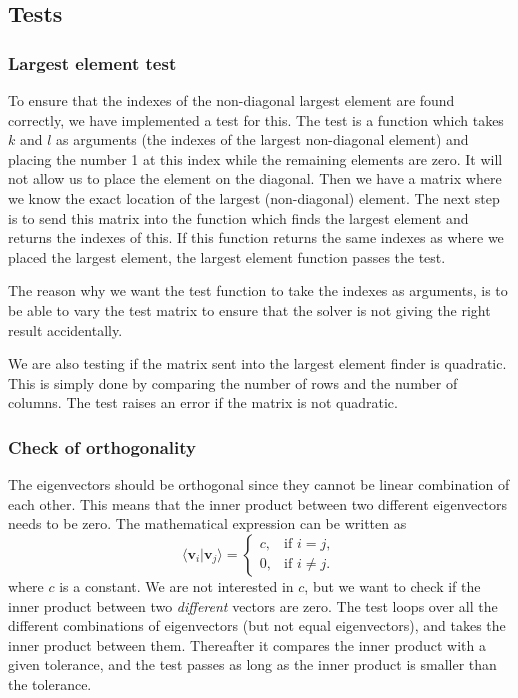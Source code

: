 \documentclass[norsk,a4paper,12pt]{article}
\begin{document}
\subsection{Tests}
\subsubsection{Largest element test}
To ensure that the indexes of the non-diagonal largest element are found correctly, we have implemented a test for this. The test is a function which takes $k$ and $l$ as arguments (the indexes of the largest non-diagonal element) and placing the number 1 at this index while the remaining elements are zero. It will not allow us to place the element on the diagonal. Then we have a matrix where we know the exact location of the largest (non-diagonal) element. The next step is to send this matrix into the function which finds the largest element and returns the indexes of this. If this function returns the same indexes as where we placed the largest element, the largest element function passes the test.\par\vspace{3mm}
The reason why we want the test function to take the indexes as arguments, is to be able to vary the test matrix to ensure that the solver is not giving the right result accidentally.\par\vspace{3mm} 
We are also testing if the matrix sent into the largest element finder is quadratic. This is simply done by comparing the number of rows and the number of columns. The test raises an error if the matrix is not quadratic.

\subsubsection{Check of orthogonality}
The eigenvectors should be orthogonal since they cannot be linear combination of each other. This means that the inner product between two different eigenvectors needs to be zero. The mathematical expression can be written as
\begin{equation}
\langle \textbf{v}_i|\textbf{v}_j\rangle =
    \begin{cases}
            c, &         \text{if } i=j,\\
            0, &         \text{if } i\neq j.
    \end{cases}
\end{equation}
where $c$ is a constant. We are not interested in $c$, but we want to check if the inner product between two \textit{different} vectors are zero. The test loops over all the different combinations of eigenvectors (but not equal eigenvectors), and takes the inner product between them. Thereafter it compares the inner product with a given tolerance, and the test passes as long as the inner product is smaller than the tolerance.
\end{document}
